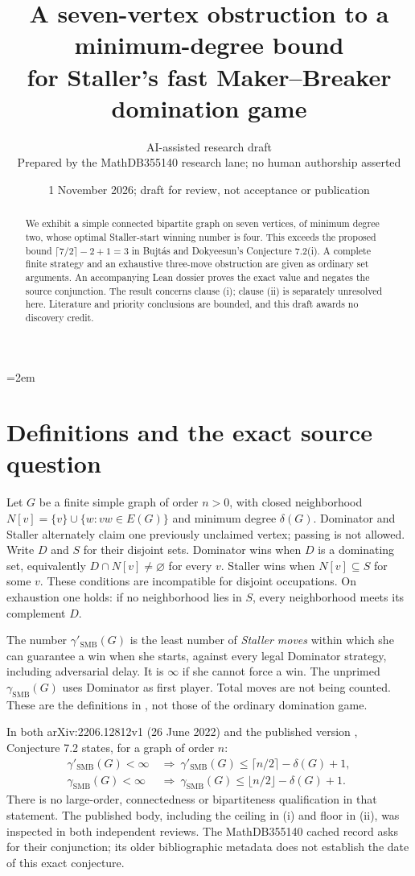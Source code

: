 \documentclass[11pt]{article}
\title{A seven-vertex obstruction to a minimum-degree bound\\for Staller's fast Maker--Breaker domination game}
\author{AI-assisted research draft\\\small Prepared by the MathDB355140 research lane; no human authorship asserted}
\date{1 November 2026; draft for review, not acceptance or publication}
\newcommand{\gs}{\gamma'_{\mathrm{SMB}}}
\newcommand{\gd}{\gamma_{\mathrm{SMB}}}
\begin{document}
\emergencystretch=2em\maketitle
\begin{abstract}
We exhibit a simple connected bipartite graph on seven vertices, of minimum degree two, whose optimal Staller-start winning number is four. This exceeds the proposed bound $\lceil 7/2\rceil-2+1=3$ in Bujt\'as and Dokyeesun's Conjecture 7.2(i). A complete finite strategy and an exhaustive three-move obstruction are given as ordinary set arguments. An accompanying Lean dossier proves the exact value and negates the source conjunction. The result concerns clause (i); clause (ii) is separately unresolved here. Literature and priority conclusions are bounded, and this draft awards no discovery credit.
\end{abstract}

\section{Definitions and the exact source question}
Let $G$ be a finite simple graph of order $n>0$, with closed neighborhood
$N[v]=\{v\}\cup\{w:vw\in E(G)\}$ and minimum degree $\delta(G)$.
Dominator and Staller alternately claim one previously unclaimed vertex; passing is not allowed. Write $D$ and $S$ for their disjoint sets. Dominator wins when $D$ is a dominating set, equivalently $D\cap N[v]\ne\varnothing$ for every $v$. Staller wins when $N[v]\subseteq S$ for some $v$. These conditions are incompatible for disjoint occupations. On exhaustion one holds: if no neighborhood lies in $S$, every neighborhood meets its complement $D$.

The number $\gs(G)$ is the least number of \emph{Staller moves} within which she can guarantee a win when she starts, against every legal Dominator strategy, including adversarial delay. It is $\infty$ if she cannot force a win. The unprimed $\gd(G)$ uses Dominator as first player. Total moves are not being counted. These are the definitions in \cite[Sections 1.2--1.3]{BD}, not those of the ordinary domination game.

In both arXiv:2206.12812v1 (26 June 2022) and the published version \cite{BD}, Conjecture 7.2 states, for a graph of order $n$:
\begin{align}
\gs(G)<\infty&\ \Longrightarrow\ \gs(G)\le \lceil n/2\rceil-\delta(G)+1,\tag{i}\label{sourcei}\\
\gd(G)<\infty&\ \Longrightarrow\ \gd(G)\le \lfloor n/2\rfloor-\delta(G)+1.\tag{ii}\label{sourceii}
\end{align}
There is no large-order, connectedness or bipartiteness qualification in that statement. The published body, including the ceiling in (i) and floor in (ii), was inspected in both independent reviews. The MathDB355140 cached record asks for their conjunction; its older bibliographic metadata does not establish the date of this exact conjecture.
\end{document}

